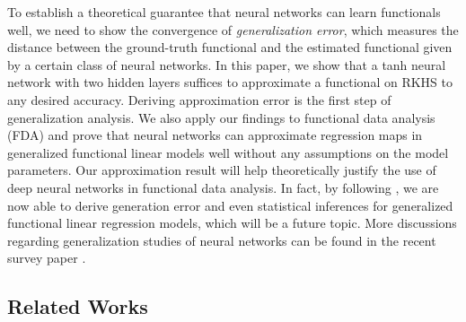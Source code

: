 \documentclass{article}
\numberwithin{equation}{section}
\begin{document}
To establish a theoretical guarantee that neural networks can learn functionals well, we need to show the convergence of {\it generalization error}, which measures the distance between the ground-truth functional and the estimated functional given by a certain class of neural networks.  
In this paper, we show that a tanh neural network with two hidden layers suffices to approximate a functional on RKHS to any desired accuracy. 
Deriving approximation error is the first step of generalization analysis. 
We also apply our findings to functional data analysis (FDA) and prove that neural networks can approximate regression maps in generalized functional linear models well without any assumptions on the model parameters. Our approximation result will help theoretically justify the use of deep neural networks in functional data analysis. In fact, by following \citep{shang2015nonparametric}, we are now able to derive generation error and even statistical inferences for generalized functional linear regression models, which will be a future topic. 
More discussions regarding generalization studies of neural networks can be found in the recent survey paper \citep{suh2024survey}.

 

\subsection{Related Works}
\end{document}
